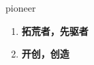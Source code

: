
\begin{frame}
{\huge pioneer}
\begin{center}
\begin{enumerate}\Large
  \item \textbf{拓荒者，先驱者}
  \item \textbf{开创，创造}
\end{enumerate}
\end{center}
\end{frame}
